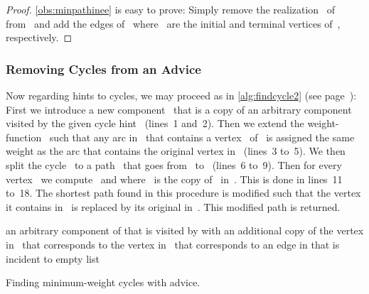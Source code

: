 \begin{proof}
  \autoref{obs:minpathinee} is easy to prove: Simply remove the realization~ of~ from~ and add the edges of~ where~ are the initial and terminal vertices of~, respectively.
\end{proof}

\subsubsection{Removing Cycles from an Advice}
Now regarding hints to cycles, we may proceed as in \autoref{alg:findcycle2} (see page~\pageref{alg:findcycle2}): First we introduce a new component~ that is a copy of an arbitrary component~ visited by the given cycle hint~ (lines~1 and~2). Then we extend the weight-function~ such that any arc in~ that contains a vertex~ of~ is assigned the same weight as the arc that contains the original vertex in~ (lines~3 to~5). We then split the cycle~ to a path~ that goes from~ to~ (lines~6 to~9). Then for every vertex~ we compute~ and  where~ is the copy of~ in~. This is done in lines~11 to~18. The shortest path found in this procedure is modified such that the vertex it contains in~ is replaced by its original in~. This modified path is returned.
\begin{algorithm}
  \LinesNumbered
  


  \BlankLine
   an arbitrary component of  that is visited by \;
    with an additional copy  of \;
   the vertex in~ that corresponds to \;
   the vertex in~ that corresponds to \;
   an edge in  that is incident to \;
   \;
  \spath  empty list\;
  
  
  \caption{Finding minimum-weight cycles with advice.}
  \label{alg:findcycle2}
\end{algorithm}


